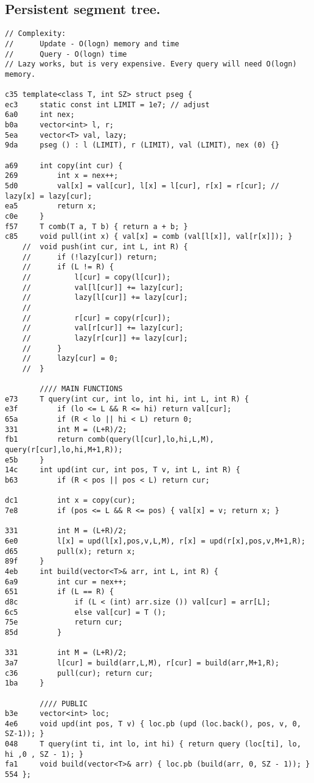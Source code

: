 \documentclass[11pt, a4paper, twoside]{article}
\begin{document}
\subsection{Persistent segment tree.}
\begin{lstlisting}
// Complexity: 
//      Update - O(logn) memory and time
//      Query - O(logn) time
// Lazy works, but is very expensive. Every query will need O(logn) memory.

c35 template<class T, int SZ> struct pseg {
ec3     static const int LIMIT = 1e7; // adjust
6a0     int nex;
b0a     vector<int> l, r;
5ea     vector<T> val, lazy;
9da     pseg () : l (LIMIT), r (LIMIT), val (LIMIT), nex (0) {}
    
a69     int copy(int cur) {
269         int x = nex++;
5d0         val[x] = val[cur], l[x] = l[cur], r[x] = r[cur]; // lazy[x] = lazy[cur];
ea5         return x;
c0e     }
f57     T comb(T a, T b) { return a + b; }
c85     void pull(int x) { val[x] = comb (val[l[x]], val[r[x]]); } 
    //  void push(int cur, int L, int R) { 
    //      if (!lazy[cur]) return;
    //      if (L != R) {
    //          l[cur] = copy(l[cur]);
    //          val[l[cur]] += lazy[cur];
    //          lazy[l[cur]] += lazy[cur];
    //          
    //          r[cur] = copy(r[cur]);
    //          val[r[cur]] += lazy[cur];
    //          lazy[r[cur]] += lazy[cur];
    //      }
    //      lazy[cur] = 0;
    //  }
     
        //// MAIN FUNCTIONS
e73     T query(int cur, int lo, int hi, int L, int R) {  
e3f         if (lo <= L && R <= hi) return val[cur];
65a         if (R < lo || hi < L) return 0;
331         int M = (L+R)/2;
fb1         return comb(query(l[cur],lo,hi,L,M), query(r[cur],lo,hi,M+1,R));
e5b     }
14c     int upd(int cur, int pos, T v, int L, int R) {
b63         if (R < pos || pos < L) return cur;
    
dc1         int x = copy(cur);
7e8         if (pos <= L && R <= pos) { val[x] = v; return x; }
            
331         int M = (L+R)/2;
6e0         l[x] = upd(l[x],pos,v,L,M), r[x] = upd(r[x],pos,v,M+1,R);
d65         pull(x); return x;
89f     }
4eb     int build(vector<T>& arr, int L, int R) {
6a9         int cur = nex++;
651         if (L == R) {
d8c             if (L < (int) arr.size ()) val[cur] = arr[L];
6c5             else val[cur] = T ();
75e             return cur;
85d         }
    
331         int M = (L+R)/2;
3a7         l[cur] = build(arr,L,M), r[cur] = build(arr,M+1,R);
c36         pull(cur); return cur;
1ba     }
        
        //// PUBLIC
b3e     vector<int> loc;
4e6     void upd(int pos, T v) { loc.pb (upd (loc.back(), pos, v, 0, SZ-1)); }
048     T query(int ti, int lo, int hi) { return query (loc[ti], lo, hi ,0 , SZ - 1); }
fa1     void build(vector<T>& arr) { loc.pb (build(arr, 0, SZ - 1)); }
554 };
\end{lstlisting}
\end{document}
